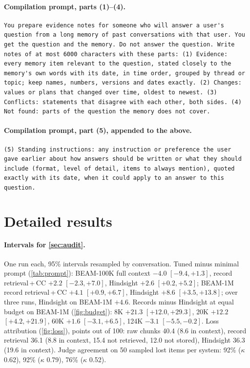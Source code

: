 \paragraph{Compilation prompt, parts (1)--(4).}
{\footnotesize\begin{verbatim}
You prepare evidence notes for someone who will answer a user's
question from a long memory of past conversations with that user. You
get the question and the memory. Do not answer the question. Write
notes of at most 6000 characters with these parts: (1) Evidence:
every memory item relevant to the question, stated closely to the
memory's own words with its date, in time order, grouped by thread or
topic; keep names, numbers, versions and dates exactly. (2) Changes:
values or plans that changed over time, oldest to newest. (3)
Conflicts: statements that disagree with each other, both sides. (4)
Not found: parts of the question the memory does not cover.
\end{verbatim}}

\paragraph{Compilation prompt, part (5), appended to the above.}
{\footnotesize\begin{verbatim}
(5) Standing instructions: any instruction or preference the user
gave earlier about how answers should be written or what they should
include (format, level of detail, items to always mention), quoted
exactly with its date, when it could apply to an answer to this
question.
\end{verbatim}}

\section{Detailed results}\label{app:detail}
\paragraph{Intervals for \cref{sec:audit}.} One run each, 95\% intervals resampled by conversation. Tuned minus minimal
prompt (\cref{tab:prompt}): BEAM-100K full context $-4.0$ $[-9.4, +1.3]$, record retrieval\,+\,CC $+2.2$
$[-2.3, +7.0]$, Hindsight $+2.6$ $[+0.2, +5.2]$; BEAM-1M record retrieval\,+\,CC $+4.1$ $[+0.9, +6.7]$, Hindsight $+8.6$
$[+3.5, +13.8]$; over three runs, Hindsight on BEAM-1M $+4.6$. Records minus Hindsight at equal budget on BEAM-1M
(\cref{fig:budget}): 8K $+21.3$ $[+12.0, +29.3]$, 20K $+12.2$ $[+4.2, +21.9]$, 60K $+1.6$ $[-3.1, +6.5]$, 124K $-3.1$
$[-5.5, -0.2]$. Loss attribution (\cref{fig:loss}), points out of 100: raw chunks 40.4 (8.6 in context), record
retrieval 36.1 (8.8 in context, 15.4 not retrieved, 12.0 not stored), Hindsight 36.3 (19.6 in context). Judge
agreement on 50 sampled lost items per system: 92\% ($\kappa$ 0.62), 92\% ($\kappa$ 0.79), 76\% ($\kappa$ 0.52).

